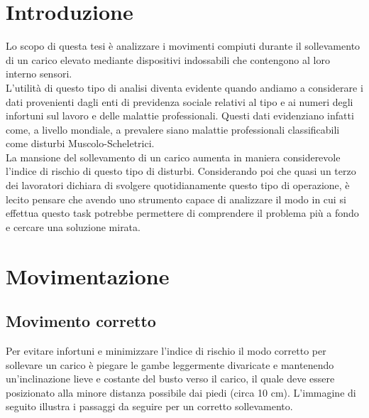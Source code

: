 \documentclass[a4paper]{article}
\begin{document}
	
	
\begin{frontespizio} 
 \Preambolo{\renewcommand{\frontpretitlefont}{\fontsize{14}{12}\scshape}}


\Rientro{1cm} 
\Punteggiatura{} 
 
\end{frontespizio}

	\tableofcontents

	\clearpage


	\section{Introduzione}
Lo scopo di questa tesi è analizzare i movimenti compiuti durante il sollevamento di un carico elevato mediante dispositivi indossabili che contengono al loro interno sensori. \\
L’utilità di questo tipo di analisi diventa evidente quando andiamo a considerare i dati provenienti dagli enti di previdenza sociale relativi al tipo e ai numeri degli infortuni sul lavoro e delle malattie professionali. Questi dati evidenziano infatti come, a livello mondiale, a prevalere siano malattie professionali classificabili come disturbi Muscolo-Scheletrici. \\
La mansione del sollevamento di un carico aumenta in maniera considerevole l'indice di rischio di questo tipo di disturbi.
Considerando poi che quasi un terzo dei lavoratori dichiara di svolgere quotidianamente questo tipo di operazione, è lecito pensare che avendo uno strumento capace di analizzare il modo in cui si effettua questo task potrebbe permettere di comprendere il problema più a fondo e cercare una soluzione mirata.

	\clearpage

	\section{Movimentazione}

	\subsection{Movimento corretto}
Per evitare infortuni e minimizzare l'indice di rischio il modo corretto per sollevare un carico è piegare le gambe leggermente divaricate e mantenendo un’inclinazione lieve e costante del busto verso il carico, il quale deve essere posizionato alla minore distanza possibile dai piedi (circa 10 cm). L'immagine di seguito illustra i passaggi da seguire per un corretto sollevamento.
\end{document}
